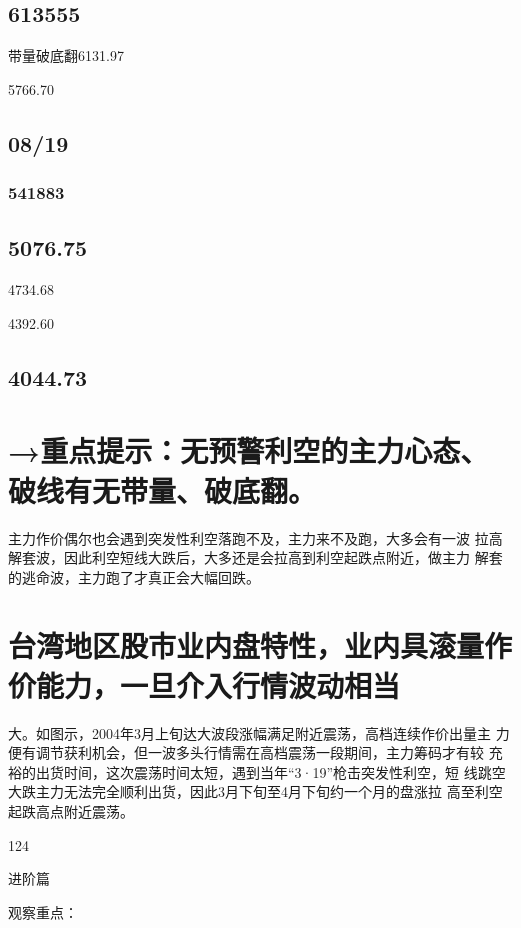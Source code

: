 \documentclass{article}
\begin{document}
\subsection{613555}

带量破底翻6131.97

5766.70

\subsection{08/19}

\subsubsection{541883}

\subsection{5076.75}

4734.68

4392.60

\subsection{4044.73}

\section{→重点提示：无预警利空的主力心态、破线有无带量、破底翻。}

主力作价偶尔也会遇到突发性利空落跑不及，主力来不及跑，大多会有一波 拉高解套波，因此利空短线大跌后，大多还是会拉高到利空起跌点附近，做主力 解套的逃命波，主力跑了才真正会大幅回跌。

\section{台湾地区股市业内盘特性，业内具滚量作价能力，一旦介入行情波动相当}

大。如图示，2004年3月上旬达大波段涨幅满足附近震荡，高档连续作价出量主 力便有调节获利机会，但一波多头行情需在高档震荡一段期间，主力筹码才有较 充裕的出货时间，这次震荡时间太短，遇到当年“3·19”枪击突发性利空，短 线跳空大跌主力无法完全顺利出货，因此3月下旬至4月下旬约一个月的盘涨拉 高至利空起跌高点附近震荡。

124

\clearpage

进阶篇

观察重点：
\end{document}
